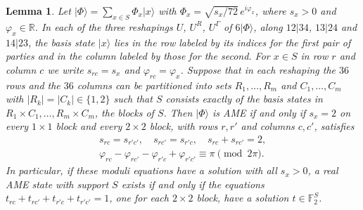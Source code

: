 \documentclass[aps,pra,reprint,superscriptaddress,amsmath,amssymb,longbibliography]{revtex4-2}
\newcommand{\ket}[1]{\lvert #1\rangle}
\theoremstyle{plain}
\newtheorem{lemma}{Lemma}
\begin{document}
\begin{lemma}\label{lem:blocks}
Let $\ket\Phi=\sum_{x\in S}\Phi_x\ket x$ with $\Phi_x=\sqrt{s_x/72}\,e^{i\varphi_x}$, where $s_x>0$ and
$\varphi_x\in\mathbb R$.  In each of the three reshapings $U$, $U^R$, $U^\Gamma$ of $6\ket\Phi$, along $12|34$,
$13|24$ and $14|23$, the basis state $\ket x$ lies in the row labeled by its indices for the first pair of parties and
in the column labeled by those for the second.  For $x\in S$ in row $r$ and column $c$ we write $s_{rc}=s_x$ and
$\varphi_{rc}=\varphi_x$.  Suppose that in each reshaping the $36$ rows and the $36$ columns can be partitioned into
sets $R_1,\dots,R_m$ and $C_1,\dots,C_m$ with $|R_k|=|C_k|\in\{1,2\}$ such that $S$ consists exactly of the basis
states in $R_1\times C_1,\dots,R_m\times C_m$, the \emph{blocks} of $S$.  Then $\ket\Phi$ is AME if and only if
$s_x=2$ on every $1\times1$ block and every $2\times2$ block, with rows $r,r'$ and columns $c,c'$, satisfies
\begin{equation}\label{eq:congruence}
\begin{gathered}
s_{rc}=s_{r'c'},\quad s_{rc'}=s_{r'c},\quad s_{rc}+s_{rc'}=2,\\
\varphi_{rc}-\varphi_{rc'}-\varphi_{r'c}+\varphi_{r'c'}\equiv\pi\pmod{2\pi}.
\end{gathered}
\end{equation}
In particular, if these moduli equations have a solution with all $s_x>0$, a real AME state with support $S$ exists
if and only if the equations $t_{rc}+t_{rc'}+t_{r'c}+t_{r'c'}=1$, one for each $2\times2$ block, have a solution
$t\in\mathbb F_2^S$.
\end{lemma}
\end{document}
